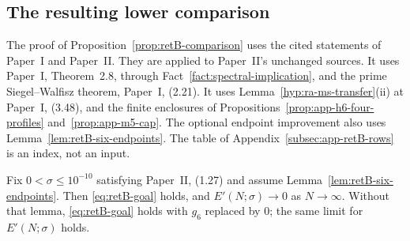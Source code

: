 \subsection{The resulting lower comparison}

\begin{remark}[Inputs]\label{rem:retB-inputs}
The proof of Proposition~\ref{prop:retB-comparison} uses the cited
statements of Paper~I and Paper~II. They are applied to Paper~II's unchanged sources.
It uses Paper~I, Theorem~2.8, through
Fact~\ref{fact:spectral-implication}, and the prime Siegel--Walfisz theorem,
Paper~I, (2.21). It uses Lemma~\ref{hyp:ra-ms-transfer}(ii) at
Paper~I, (3.48), and
the finite enclosures of Propositions~\ref{prop:app-h6-four-profiles}
and~\ref{prop:app-m5-cap}. The optional endpoint improvement also uses
Lemma~\ref{lem:retB-six-endpoints}. The table of
Appendix~\ref{subsec:app-retB-rows} is an index, not an input.
\end{remark}

\begin{proposition}\label{prop:retB-comparison}
Fix $0<\sigma\le10^{-10}$ satisfying Paper~II, (1.27) and assume
Lemma~\ref{lem:retB-six-endpoints}.
Then \eqref{eq:retB-goal} holds, and $E'(N;\sigma)\to0$ as $N\to\infty$.
Without that lemma, \eqref{eq:retB-goal} holds with $g_6$ replaced by $0$;
the same limit for $E'(N;\sigma)$ holds.
\end{proposition}

